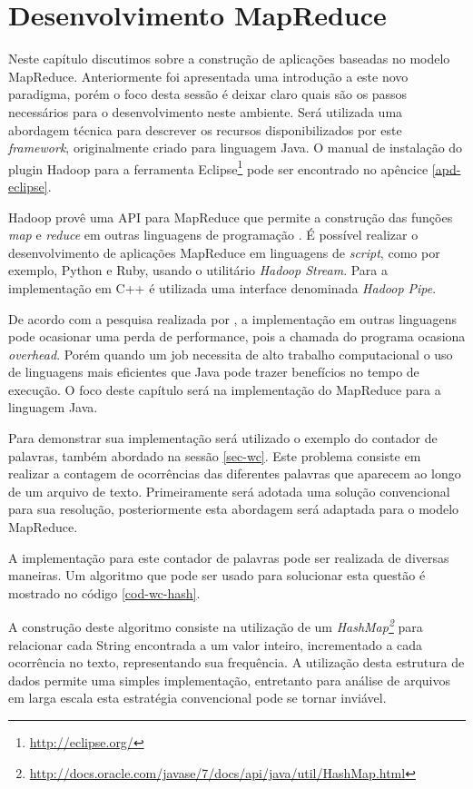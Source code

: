 \chapter{Desenvolvimento MapReduce}
\label{cap:mapreduce-devel}

Neste capítulo discutimos sobre a construção de aplicações baseadas no modelo MapReduce. Anteriormente foi apresentada uma introdução a este novo paradigma, porém o foco desta sessão é deixar claro quais são os passos necessários para o desenvolvimento neste ambiente. Será utilizada uma abordagem técnica para descrever os recursos disponibilizados por este \textit{framework}, originalmente criado para linguagem Java. O manual de instalação do plugin Hadoop para a ferramenta Eclipse\footnote{\url{http://eclipse.org/}} pode ser encontrado no apêncice \ref{apd-eclipse}.

Hadoop provê uma API para MapReduce que permite a construção das funções \textit{map} e \textit{reduce} em outras linguagens de programação \cite{white2012}. É possível realizar o desenvolvimento de aplicações MapReduce em linguagens de \textit{script}, como por exemplo, Python e Ruby, usando o utilitário \textit{Hadoop Stream}. Para a implementação em C++ é utilizada uma interface denominada \textit{Hadoop Pipe}.

De acordo com a pesquisa realizada por , a implementação em outras linguagens pode ocasionar uma perda de performance, pois a chamada do programa ocasiona \textit{overhead}. Porém quando um job necessita de alto trabalho computacional o uso de linguagens mais eficientes que Java pode trazer benefícios no tempo de execução. O foco deste capítulo será na implementação do MapReduce para a linguagem Java.

Para demonstrar sua implementação será utilizado o exemplo do contador de palavras, também abordado na sessão \ref{sec-wc}. Este problema consiste em realizar a contagem de ocorrências das diferentes palavras que aparecem ao longo de um arquivo de texto. Primeiramente será adotada uma solução convencional para sua resolução, posteriormente esta abordagem será adaptada para o modelo MapReduce.

A implementação para este contador de palavras pode ser realizada de diversas maneiras. Um algoritmo que pode ser usado para solucionar esta questão é mostrado no código \ref{cod-wc-hash}.

A construção deste algoritmo consiste na utilização de um \textit{HashMap\footnote{\url{http://docs.oracle.com/javase/7/docs/api/java/util/HashMap.html}}} para relacionar cada String encontrada a um valor inteiro, incrementado a cada ocorrência no texto, representando sua frequência. A utilização desta estrutura de dados permite uma simples implementação, entretanto para análise de arquivos em larga escala esta estratégia convencional pode se tornar inviável.

